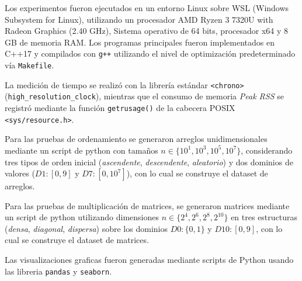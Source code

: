 Los experimentos fueron ejecutados en un entorno Linux
sobre WSL (Windows Subsystem for Linux), utilizando un
procesador AMD Ryzen 3 7320U with Radeon Graphics (2.40 GHz),
Sistema operativo de 64 bits, procesador x64 y 8 GB de memoria
RAM. Los programas principales fueron implementados en C++17
y compilados con \texttt{g++} utilizando el nivel de
optimización predeterminado vía \texttt{Makefile}. 

\vspace{0.4cm}

La medición de tiempo se realizó con la librería estándar
\texttt{<chrono>} (\texttt{high\_resolution\_clock}),
mientras que el consumo de memoria \textit{Peak RSS} se
registró mediante la función \texttt{getrusage()} de la
cabecera POSIX \texttt{<sys/resource.h>}. 

\vspace{0.4cm}

Para las pruebas de ordenamiento se generaron arreglos
unidimensionales mediante un script de python con tamaños 
$n \in \{10^1, 10^3, 10^5, 10^7\}$, considerando tres tipos
de orden inicial (\textit{ascendente},
\textit{descendente}, \textit{aleatorio}) y dos dominios de
valores ($D1: [0, 9]$ y $D7: [0, 10^7]$),
con lo cual se construye el dataset de arreglos. 

\vspace{0.4cm}

Para las pruebas de multiplicación de matrices, se generaron 
matrices mediante un script de python utilizando dimensiones
$n \in \{2^4, 2^6, 2^8, 2^{10}\}$ en tres estructuras
(\textit{densa}, \textit{diagonal}, \textit{dispersa})
sobre los dominios $D0: \{0, 1\}$ y $D10: [0, 9]$, con lo cual
se construye el dataset de matrices. 

\vspace{0.4cm}

Las visualizaciones graficas fueron generadas mediante
scripts de Python usando las libreria \texttt{pandas} y
\texttt{seaborn}.